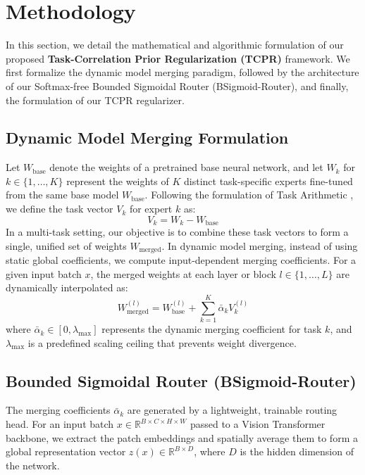 \section{Methodology}
\label{sec:method}

In this section, we detail the mathematical and algorithmic formulation of our proposed \textbf{Task-Correlation Prior Regularization (TCPR)} framework. We first formalize the dynamic model merging paradigm, followed by the architecture of our Softmax-free Bounded Sigmoidal Router (BSigmoid-Router), and finally, the formulation of our TCPR regularizer.

\subsection{Dynamic Model Merging Formulation}
Let $W_{\text{base}}$ denote the weights of a pretrained base neural network, and let $W_k$ for $k \in \{1, \dots, K\}$ represent the weights of $K$ distinct task-specific experts fine-tuned from the same base model $W_{\text{base}}$. Following the formulation of Task Arithmetic \cite{ilharco2022editing}, we define the task vector $V_k$ for expert $k$ as:
\begin{equation}
    V_k = W_k - W_{\text{base}}
\end{equation}
In a multi-task setting, our objective is to combine these task vectors to form a single, unified set of weights $W_{\text{merged}}$. In dynamic model merging, instead of using static global coefficients, we compute input-dependent merging coefficients. For a given input batch $x$, the merged weights at each layer or block $l \in \{1, \dots, L\}$ are dynamically interpolated as:
\begin{equation}
    W_{\text{merged}}^{(l)} = W_{\text{base}}^{(l)} + \sum_{k=1}^K \bar{\alpha}_k V_k^{(l)}
\end{equation}
where $\bar{\alpha}_k \in [0, \lambda_{\text{max}}]$ represents the dynamic merging coefficient for task $k$, and $\lambda_{\text{max}}$ is a predefined scaling ceiling that prevents weight divergence.

\subsection{Bounded Sigmoidal Router (BSigmoid-Router)}
The merging coefficients $\bar{\alpha}_k$ are generated by a lightweight, trainable routing head. For an input batch $x \in \mathbb{R}^{B \times C \times H \times W}$ passed to a Vision Transformer backbone, we extract the patch embeddings and spatially average them to form a global representation vector $z(x) \in \mathbb{R}^{B \times D}$, where $D$ is the hidden dimension of the network.


